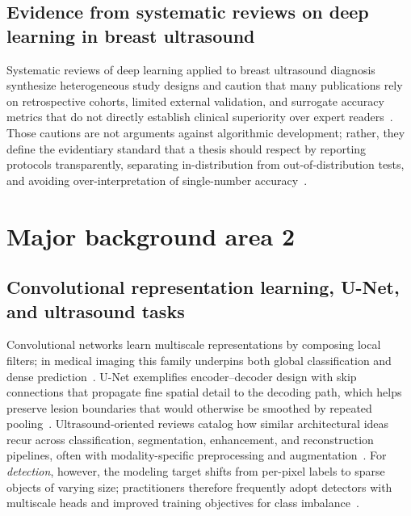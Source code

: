\documentclass[
english,                 %
bibtex,                  %
]{kththesis}
\numberwithin{listing}{chapter}
\begin{document}
\subsection{Evidence from systematic reviews on deep learning in breast ultrasound}
Systematic reviews of deep learning applied to breast ultrasound diagnosis synthesize heterogeneous study designs and caution that many publications rely on retrospective cohorts, limited external validation, and surrogate accuracy metrics that do not directly establish clinical superiority over expert readers~\cite{dan2024_breast_us_dl_review}.
Those cautions are not arguments against algorithmic development; rather, they define the evidentiary standard that a thesis should respect by reporting protocols transparently, separating in-distribution from out-of-distribution tests, and avoiding over-interpretation of single-number accuracy~\cite{dan2024_breast_us_dl_review,wang2021_ultrasound_dl_review}.

\section{Major background area 2}

\subsection{Convolutional representation learning, U-Net, and ultrasound tasks}
Convolutional networks learn multiscale representations by composing local filters; in medical imaging this family underpins both global classification and dense prediction~\cite{litjens2017_survey_deep_medical}.
U-Net exemplifies encoder--decoder design with skip connections that propagate fine spatial detail to the decoding path, which helps preserve lesion boundaries that would otherwise be smoothed by repeated pooling~\cite{ronneberger2015_unet}.
Ultrasound-oriented reviews catalog how similar architectural ideas recur across classification, segmentation, enhancement, and reconstruction pipelines, often with modality-specific preprocessing and augmentation~\cite{wang2021_ultrasound_dl_review}.
For \emph{detection}, however, the modeling target shifts from per-pixel labels to sparse objects of varying size; practitioners therefore frequently adopt detectors with multiscale heads and improved training objectives for class imbalance~\cite{lin2017_focal_loss_retinanet,redmon2018_yolov3}.
\end{document}

